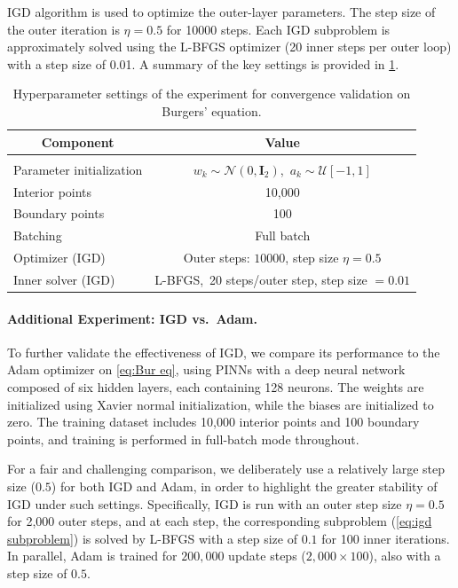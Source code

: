 \documentclass{article}
\begin{document}
IGD algorithm is used to optimize the outer-layer parameters. 
The step size of the outer iteration is $\eta=0.5$ for 10000 steps. 
Each IGD subproblem is approximately solved using the L-BFGS optimizer (20 inner steps per outer loop) with a step size of 0.01. 
A summary of the key settings is provided in \cref{tab:loss_rf_hyperparams}.
\begin{table}[h]
\caption{Hyperparameter settings of the experiment for convergence validation on Burgers' equation.}
\label{tab:loss_rf_hyperparams}
\begin{center}
\begin{tabular}{lc}
\multicolumn{1}{c}{\bf Component} & \multicolumn{1}{c}{\bf Value} \\
\hline \\
Parameter initialization & $w_k \sim \mathcal{N}(0, \mathbf{I}_2)$,\ $a_k \sim \mathcal{U}[-1,1]$ \\
Interior points          & 10,000 \\
Boundary points          & 100 \\
Batching                 & Full batch \\
Optimizer (IGD)          & Outer steps: $10000$, step size $\eta=0.5$ \\
Inner solver (IGD)       & L-BFGS,\ 20 steps/outer step, step size $=0.01$ \\
\end{tabular}
\end{center}
\end{table}
\iffalse
\paragraph{Additional Experiment: IGD vs.\ Adam.}
To further validate the effectiveness of IGD, we compare its performance to the Adam optimizer on \cref{eq:Bur eq}, using PINNs with a deep neural network composed of six hidden layers, each containing 128 neurons. 
The weights are initialized using Xavier normal initialization, while the biases are initialized to zero.
The training dataset includes 10,000 interior points and 100 boundary points, and training is performed in full-batch mode throughout.

For a fair and challenging comparison, we deliberately use a relatively large step size ($0.5$) for both IGD and Adam, in order to highlight the greater stability of IGD under such settings. 
Specifically, IGD is run with an outer step size $\eta = 0.5$ for 2,000 outer steps, and at each step, the corresponding subproblem (\cref{eq:igd subproblem}) is solved by L-BFGS with a step size of $0.1$ for 100 inner iterations. 
In parallel, Adam is trained for $200{,}000$ update steps ($2,000 \times 100$), also with a step size of $0.5$. 
\end{document}
